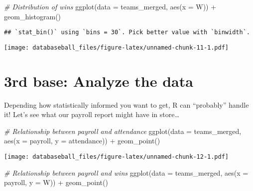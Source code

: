 \documentclass[
]{article}
\newenvironment{Shaded}{\begin{snugshade}}{\end{snugshade}}
\newcommand{\AttributeTok}[1]{\textcolor[rgb]{0.77,0.63,0.00}{#1}}
\newcommand{\CommentTok}[1]{\textcolor[rgb]{0.56,0.35,0.01}{\textit{#1}}}
\newcommand{\FunctionTok}[1]{\textcolor[rgb]{0.00,0.00,0.00}{#1}}
\newcommand{\NormalTok}[1]{#1}
\newcommand{\SpecialCharTok}[1]{\textcolor[rgb]{0.00,0.00,0.00}{#1}}
\begin{document}
\begin{Shaded}
\begin{Highlighting}[]
\CommentTok{\# Distribution of wins}
\FunctionTok{ggplot}\NormalTok{(}\AttributeTok{data =}\NormalTok{ teams\_merged, }\FunctionTok{aes}\NormalTok{(}\AttributeTok{x =}\NormalTok{ W)) }\SpecialCharTok{+}
  \FunctionTok{geom\_histogram}\NormalTok{()}
\end{Highlighting}
\end{Shaded}

\begin{verbatim}
## `stat_bin()` using `bins = 30`. Pick better value with `binwidth`.
\end{verbatim}

\texttt{[image: databaseball\_files/figure-latex/unnamed-chunk-11-1.pdf]}

\hypertarget{rd-base-analyze-the-data}{%
\section{3rd base: Analyze the data}\label{rd-base-analyze-the-data}}

Depending how statistically informed you want to get, R can ``probably''
handle it! Let's see what our payroll report might have in store\ldots{}

\begin{Shaded}
\begin{Highlighting}[]
\CommentTok{\# Relationship between payroll and attendance}
\FunctionTok{ggplot}\NormalTok{(}\AttributeTok{data =}\NormalTok{ teams\_merged, }\FunctionTok{aes}\NormalTok{(}\AttributeTok{x =}\NormalTok{ payroll, }\AttributeTok{y =}\NormalTok{ attendance)) }\SpecialCharTok{+}
  \FunctionTok{geom\_point}\NormalTok{()}
\end{Highlighting}
\end{Shaded}

\texttt{[image: databaseball\_files/figure-latex/unnamed-chunk-12-1.pdf]}

\begin{Shaded}
\begin{Highlighting}[]
\CommentTok{\# Relationship between payroll and wins}
\FunctionTok{ggplot}\NormalTok{(}\AttributeTok{data =}\NormalTok{ teams\_merged, }\FunctionTok{aes}\NormalTok{(}\AttributeTok{x =}\NormalTok{ payroll, }\AttributeTok{y =}\NormalTok{ W)) }\SpecialCharTok{+}
  \FunctionTok{geom\_point}\NormalTok{()}
\end{Highlighting}
\end{Shaded}
\end{document}
